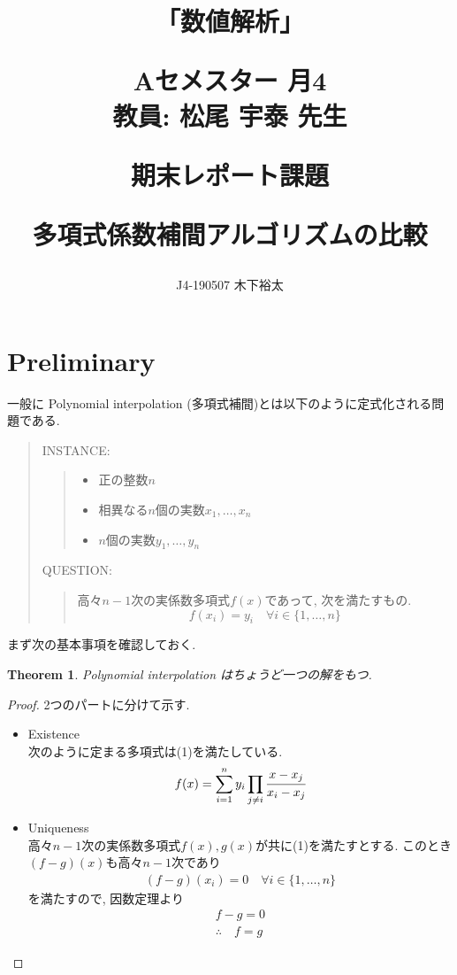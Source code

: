 \documentclass[uplatex,dvipdfmx,titlepage]{jsarticle}
\title
{
    \begin{Large}
        「数値解析」
    \end{Large}
    \begin{large}
        Aセメスター 月4　\\教員: 松尾 宇泰 先生\\
    \end{large}
    \vspace{15pt}
    \begin{Large}
        期末レポート課題\\
    \end{Large}
    \vspace{20pt}
    \begin{Huge}
      多項式係数補間アルゴリズムの比較
    \end{Huge}
    \vspace{100pt}
}
\author{
  \begin{Large}
    J4-190507 木下裕太
  \end{Large}
}
\newtheorem{theorem}{Theorem}
\begin{document}
  \maketitle

  \section{Preliminary}

  一般に Polynomial interpolation (多項式補間)とは以下のように定式化される問題である.
  \begin{quote}
    INSTANCE:
    \begin{quote}
      \begin{itemize}
        \item 正の整数$n$
        \item 相異なる$n$個の実数$x_1, \ldots , x_n$
        \item $n$個の実数$y_1, \ldots , y_n$\\
      \end{itemize}
    \end{quote}

    QUESTION:
    \begin{quote}
      高々$n-1$次の実係数多項式$f(x)$であって, 次を満たすもの.
      \begin{equation}
        f(x_i) = y_i \quad \forall i \in \{1, \ldots, n\}
      \end{equation}
    \end{quote}
  \end{quote}
  まず次の基本事項を確認しておく.

  \begin{theorem}
    Polynomial interpolation はちょうど一つの解をもつ.
  \end{theorem}

  \begin{proof}2つのパートに分けて示す.
    \begin{itemize}
      \item Existence\\
      次のように定まる多項式は(1)を満たしている.
      \begin{eqnarray}
        f(x) = \sum_{i=1}^n y_i\prod_{j\neq i} \cfrac{x-x_j}{x_i-x_j}
      \end{eqnarray}

      \item Uniqueness\\
      高々$n-1$次の実係数多項式$f(x),g(x)$が共に(1)を満たすとする.
      このとき$(f-g)(x)$も高々$n-1$次であり
      \begin{eqnarray*}
        (f-g)(x_i) = 0 \quad \forall i \in \{1, \ldots, n\}
      \end{eqnarray*}
      を満たすので, 因数定理より
      \begin{eqnarray*}
        f-g=0\\
        \therefore \quad f=g
      \end{eqnarray*}
    \end{itemize}
  \end{proof}
\end{document}

